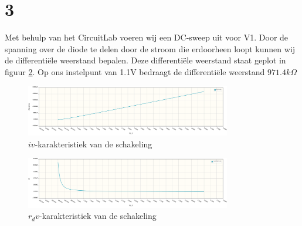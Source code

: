 \documentclass{report}
\begin{document}
\section{3}
Met behulp van het CircuitLab voeren wij een DC-sweep uit voor V1. Door de spanning over de diode te delen door de stroom die erdoorheen loopt kunnen wij de differentiële weerstand bepalen. Deze differentiële weerstand staat geplot in figuur \ref{fig:rdv}. Op ons instelpunt van 1.1V bedraagt de differentiële weerstand $971.4k\Omega$
\begin{figure}[H] 
	\centering
	\includegraphics[width=0.8\textwidth]{iv.png}
	\caption{$iv$-karakteristiek van de schakeling}
	\label{fig:iv}
\end{figure}

\begin{figure}[H]
	\centering
	\includegraphics[width=0.8\textwidth]{RdV.png}
	\caption{$r_dv$-karakteristiek van de schakeling}
	\label{fig:rdv}
\end{figure}
\end{document}
